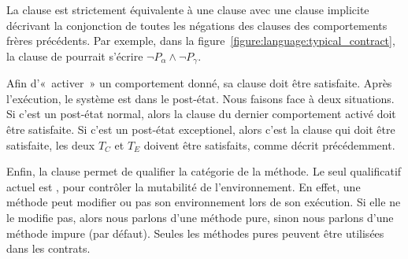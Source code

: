 La clause \adefault est strictement équivalente à une clause \abehavior avec une
clause \arequires implicite décrivant la conjonction de toutes les négations des
clauses \arequires des comportements frères précédents.  Par exemple, dans la
figure~\ref{figure:language:typical_contract}, la clause \arequires de \adefault
pourrait s'écrire $\neg P_\alpha \land \neg P_\gamma$.

Afin d'«~activer~» un comportement donné, sa clause \arequires doit être
satisfaite. Après l'exécution, le système est dans le post-état. Nous faisons
face à deux situations. Si c'est un post-état normal, alors la clause \aensures
du dernier comportement activé doit être satisfaite. Si c'est un post-état
exceptionel, alors c'est la clause \athrowable qui doit être satisfaite, \ie les
deux $T_C$ et $T_E$ doivent être satisfaits, comme décrit précédemment.

Enfin, la clause \ais permet de qualifier la catégorie de la méthode. Le seul
qualificatif actuel est , pour contrôler la mutabilité de
l'environnement. En effet, une méthode peut modifier ou pas son environnement
lors de son exécution. Si elle ne le modifie pas, alors nous parlons d'une
méthode {\strong pure}, sinon nous parlons d'une méthode {\strong impure} (par
défaut). Seules les méthodes pures peuvent être utilisées dans les contrats. \\

